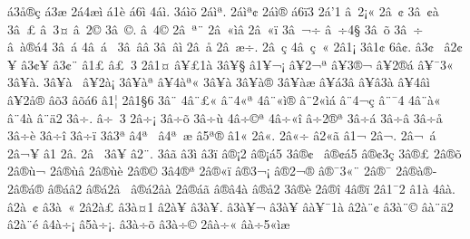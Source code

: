 {^^e13^^e5^^ae^^e7
^^e13^^e6
2^^e14^^e6^^ec
^^e11^^e8
^^e16^^ec
4^^e1^^ec.
3^^e1^^ec^^f5
2^^e1^^ec^^aa.
2^^e1^^ec^^aa^^a2
2^^e1^^ec^^ae
^^e16^^ef3
2^^e1'1
^^e2^^a02^^a1^^ab
2^^e2^^a0^^a2
3^^e2^^a0^^a2^^e0
3^^e2^^a0^^a3
^^e2^^a03^^a4
^^e2^^a02^^a9
3^^e2^^a0^^a9.
^^e2^^a04^^a9^^ad
2^^e2^^a0^^aa^^a8
2^^e2^^a0^^ab^^ec^^e2
2^^e2^^a0^^ab^^ef
3^^e2^^a0^^ac^^f7
^^e2^^a0^^ad^^f74^^a7
3^^e2^^a0^^ad^^ad^^f5
3^^e2^^a0^^ad^^ad^^f7
^^e2^^a0^^e0^^ae^^e14
3^^e2^^a0^^e1
4^^e2^^a0^^e1^^a0
3^^e2^^a0^^e2^^e2
3^^e2^^a0^^e2^^ec
2^^e2^^a0^^e5
2^^e2^^a0^^e6^^f7.
2^^e2^^a0^^e7
4^^e2^^a0^^e7^^a0^^ab
2^^e21^^a1
3^^e21^^a2
6^^e2^^a2.
^^e23^^a2^^a0
^^e22^^a2^^a5
^^e23^^a2^^a5^^ad
^^e23^^a2^^a8
^^e21^^a3
^^e2^^a3^^a03
2^^e21^^a4
^^e2^^a5^^a31^^e0
3^^e2^^a5^^a7
^^e21^^a5^^ac^^a1
^^e2^^a52^^ac^^aa
^^e2^^a53^^ae^^ac
^^e2^^a52^^ae^^e1
^^e2^^a5^^af3^^ab
3^^e2^^a5^^e0.
3^^e2^^a5^^e0^^a0
^^e2^^a52^^e0^^a1
3^^e2^^a5^^e0^^aa
^^e2^^a54^^e0^^aa^^ab
3^^e2^^a5^^e0^^ad
3^^e2^^a5^^e0^^ae
3^^e2^^a5^^e0^^e6
^^e2^^a5^^e13^^e2
^^e2^^a5^^e23^^e0
^^e2^^a54^^e2^^ec
^^e2^^a52^^e5^^ae
^^e2^^f53
^^e2^^f5^^e16
^^e21^^a6
2^^e21^^a76
3^^e2^^a8
4^^e2^^a8^^a3^^ab
^^e2^^a84^^ab^^aa
4^^e2^^a8^^ab^^ec^^ae
^^e2^^a82^^ab^^ec^^e1
^^e2^^a84^^ac^^e7
^^e2^^a8^^af4
4^^e2^^a8^^e0^^ab
^^e2^^a84^^e0^^ad
^^e2^^a8^^e42
3^^e2^^f7.
^^e2^^f7^^a03
2^^e2^^f7^^a1
3^^e2^^f7^^f5
3^^e2^^f7^^f9
4^^e2^^f7^^a9^^aa
4^^e2^^f7^^ab^^ee
^^e2^^f72^^ae^^aa
3^^e2^^f7^^e1
3^^e2^^f7^^e2
3^^e2^^f7^^e5
3^^e2^^f7^^e8
3^^e2^^f7^^ee
3^^e2^^f7^^ef
3^^e23^^aa
^^e24^^aa^^a0^^ad
^^e24^^aa^^a0^^e6
^^e25^^aa^^ae
^^e21^^ab
2^^e2^^ab.
2^^e2^^ab^^f7
^^e22^^ab^^e3
^^e21^^ac
2^^e2^^ac.
2^^e2^^ac^^a0^^e1
2^^e2^^ac^^a5
^^e21^^ad
2^^e2^^ad.
2^^e2^^ad^^a0
3^^e2^^ad^^a5
^^e22^^ad^^a8.
3^^e2^^ad^^e3
^^e23^^ad^^ec
^^e23^^ad^^ef
^^e2^^ae^^a12
^^e2^^ae^^a1^^e15
3^^e2^^ae^^a2^^a0
^^e2^^ae^^a2^^e15
^^e2^^ae^^a23^^e7
3^^e2^^ae^^a3
2^^e2^^ae^^f5
2^^e2^^ae^^f9^^ac
2^^e2^^ae^^f9^^e2
2^^e2^^ae^^f9^^e8
2^^e2^^ae^^a9
3^^e24^^ae^^aa
2^^e2^^ae^^ab^^ef
^^e2^^ae3^^ac^^a1
^^e2^^ae2^^ac^^ad^^ae
^^e2^^ae^^af3^^ab^^a8
2^^e2^^ae^^af^^ad
2^^e2^^ae^^e0^^ae^^ad
2^^e2^^ae^^e1^^ae
^^e2^^ae^^e1^^e22
^^e2^^ae^^e12^^e2^^a0
^^e2^^ae^^e12^^e2^^e0
2^^e2^^ae^^e1^^e3
^^e2^^ae^^e24^^e0
^^e2^^ae^^e52
3^^e2^^ae^^e8
2^^e2^^ae^^ee
4^^e2^^ae^^ef
2^^e21^^af2
^^e21^^e0
4^^e2^^e0.
^^e22^^e0^^a0^^a2
^^e23^^e0^^a0^^ab
2^^e22^^e0^^a3
^^e23^^e0^^a41
^^e22^^e0^^a5
^^e23^^e0^^a5.
^^e23^^e0^^a5^^ac
^^e23^^e0^^a5^^ad
^^e2^^e0^^a5^^af1^^e0
^^e22^^e0^^a8^^a2
^^e23^^e0^^a8^^a9
^^e2^^e0^^a8^^e42
^^e22^^e0^^a8^^e9
^^e24^^e0^^f7^^a1
^^e25^^e0^^f7^^a1.
^^e23^^e0^^f7^^f5
^^e23^^e0^^f7^^a9
2^^e2^^e0^^f7^^ab
^^e2^^e0^^f75^^ab^^ec^^e6
}
